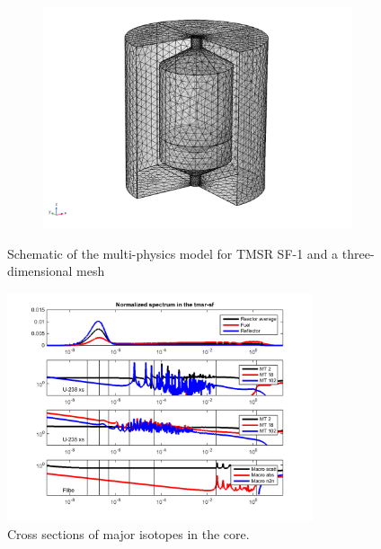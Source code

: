 \documentclass{elsarticle}
\begin{document}
\begin{figure}[h]
\begin{subfigure}{0.55\textwidth}
    \includegraphics[width = \columnwidth]{./images/diffusion/tmsr/finer.png}
  \end{subfigure}
  \caption{Schematic of the multi-physics model for TMSR SF-1 and a three-dimensional mesh}
  \label{fig:model_geom}
\end{figure}


 
\begin{figure}[h]
  \centering
  \includegraphics[width=0.8\textwidth]{./images/diffusion/tmsr/isotope_XS.png}
  \caption{Cross sections of major isotopes in the core.}
  \label{fig:xs_isotope}
\end{figure}
\end{document}
